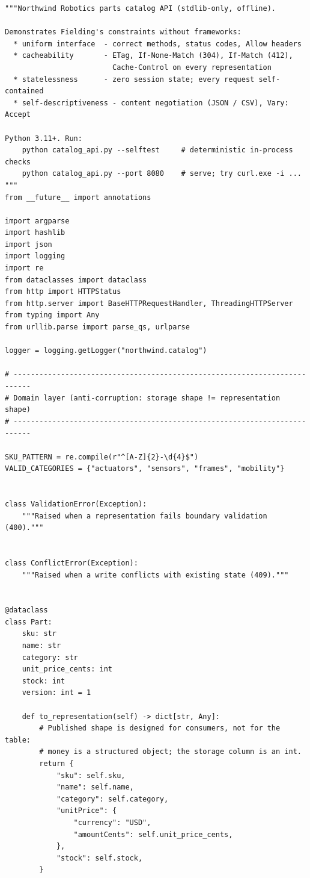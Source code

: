 \begin{verbatim}
"""Northwind Robotics parts catalog API (stdlib-only, offline).

Demonstrates Fielding's constraints without frameworks:
  * uniform interface  - correct methods, status codes, Allow headers
  * cacheability       - ETag, If-None-Match (304), If-Match (412),
                         Cache-Control on every representation
  * statelessness      - zero session state; every request self-contained
  * self-descriptiveness - content negotiation (JSON / CSV), Vary: Accept

Python 3.11+. Run:
    python catalog_api.py --selftest     # deterministic in-process checks
    python catalog_api.py --port 8080    # serve; try curl.exe -i ...
"""
from __future__ import annotations

import argparse
import hashlib
import json
import logging
import re
from dataclasses import dataclass
from http import HTTPStatus
from http.server import BaseHTTPRequestHandler, ThreadingHTTPServer
from typing import Any
from urllib.parse import parse_qs, urlparse

logger = logging.getLogger("northwind.catalog")

# --------------------------------------------------------------------------
# Domain layer (anti-corruption: storage shape != representation shape)
# --------------------------------------------------------------------------

SKU_PATTERN = re.compile(r"^[A-Z]{2}-\d{4}$")
VALID_CATEGORIES = {"actuators", "sensors", "frames", "mobility"}


class ValidationError(Exception):
    """Raised when a representation fails boundary validation (400)."""


class ConflictError(Exception):
    """Raised when a write conflicts with existing state (409)."""


@dataclass
class Part:
    sku: str
    name: str
    category: str
    unit_price_cents: int
    stock: int
    version: int = 1

    def to_representation(self) -> dict[str, Any]:
        # Published shape is designed for consumers, not for the table:
        # money is a structured object; the storage column is an int.
        return {
            "sku": self.sku,
            "name": self.name,
            "category": self.category,
            "unitPrice": {
                "currency": "USD",
                "amountCents": self.unit_price_cents,
            },
            "stock": self.stock,
        }



\end{verbatim}
